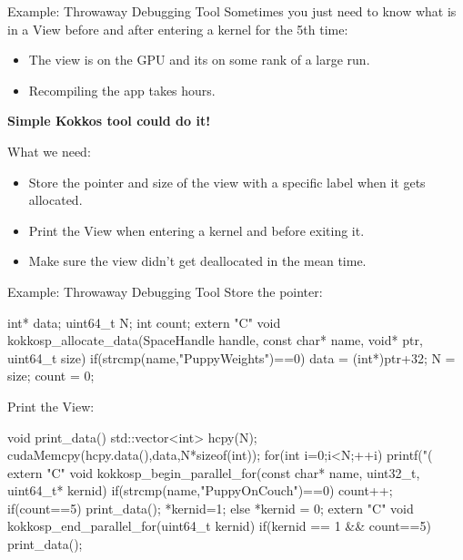 \begin{frame}[fragile]{Example: Throwaway Debugging Tool}
Sometimes you just need to know what is in a View before and after entering a kernel for the 5th time:
\begin{itemize}
  \item The view is on the GPU and its on some rank of a large run.
  \item Recompiling the app takes hours.
\end{itemize}

\pause
\vspace{10pt}
\textbf{Simple Kokkos tool could do it!}

What we need:
\begin{itemize}
  \item Store the pointer and size of the view with a specific label when it gets allocated.
  \item Print the View when entering a kernel and before exiting it. 
  \item Make sure the view didn't get deallocated in the mean time. 
\end{itemize}
\end{frame}

\begin{frame}[fragile]{Example: Throwaway Debugging Tool}
Store the pointer:
\vspace{-2pt}
\begin{code}[keywords={int,uint64_t,extern,void,const,char,void,if}]
int* data; uint64_t N; int count;
extern "C" void kokkosp_allocate_data(SpaceHandle handle,
  const char* name, void* ptr, uint64_t size) {
  if(strcmp(name,"PuppyWeights")==0) {
    data = (int*)ptr+32; N = size; count = 0;
}}
\end{code}

Print the View:
\vspace{-2pt}
\begin{code}[keywords={int,uint64_t,extern,void,const,char,void,if,else}]
void print_data() { 
  std::vector<int> hcpy(N);
  cudaMemcpy(hcpy.data(),data,N*sizeof(int));
  for(int i=0;i<N;++i) printf("(%
}
extern "C" void kokkosp_begin_parallel_for(const char* name, 
  uint32_t, uint64_t* kernid) {
  if(strcmp(name,"PuppyOnCouch")==0) { 
    count++; if(count==5) print_data(); *kernid=1;
  } else { *kernid = 0; } 
}
extern "C" void kokkosp_end_parallel_for(uint64_t kernid) {
  if(kernid == 1 && count==5) print_data();
}
\end{code}

\end{frame}

